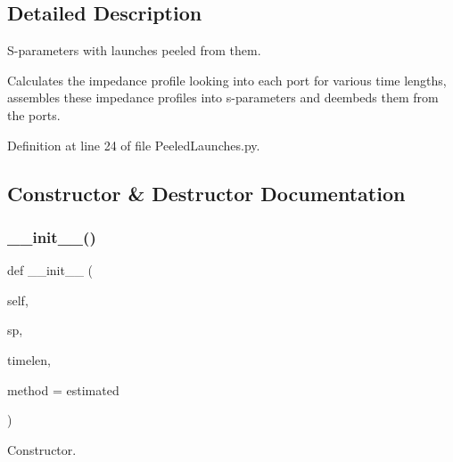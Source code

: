 \subsection{Detailed Description}
S-\/parameters with launches peeled from them. 

Calculates the impedance profile looking into each port for various time lengths, assembles these impedance profiles into s-\/parameters and deembeds them from the ports. 

Definition at line 24 of file Peeled\+Launches.\+py.



\subsection{Constructor \& Destructor Documentation}
\mbox{\label{classSignalIntegrity_1_1ImpedanceProfile_1_1PeeledLaunches_1_1PeeledLaunches_a5ad5af04a370e25cc809b024b20dd7ba}} 
\subsubsection{\texorpdfstring{\+\_\+\+\_\+init\+\_\+\+\_\+()}{\_\_init\_\_()}}
{\footnotesize\ttfamily def \+\_\+\+\_\+init\+\_\+\+\_\+ (\begin{DoxyParamCaption}\item[{}]{self,  }\item[{}]{sp,  }\item[{}]{timelen,  }\item[{}]{method = {\ttfamily \textquotesingle{}estimated\textquotesingle{}} }\end{DoxyParamCaption})}



Constructor. 


